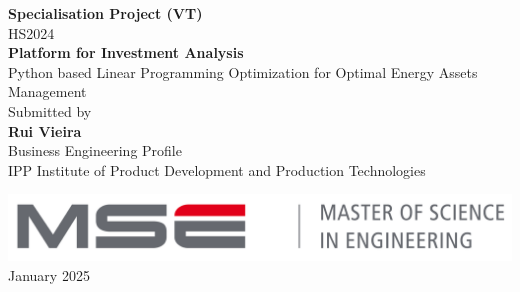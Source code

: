 \begin{titlepage}

\begin{center}

\textup{\small {\bf Specialisation Project (VT) } \\  HS2024}\\[3.0in]

\fontsize{20}{24}\selectfont
\textbf {Platform for Investment Analysis}\\
\normalsize Python based Linear Programming Optimization for Optimal Energy Assets Management\\[3.0in]


       

\normalsize Submitted by \\[0.2in]
\textbf{Rui Vieira}\\
Business Engineering Profile\\
IPP Institute of Product Development and Production Technologies\\

\vspace{.2in}




\vspace{.3in}

\includegraphics[width=0.4 \textwidth]{images/mse.png}\\[0.1in]

January 2025

\end{center}

\end{titlepage}